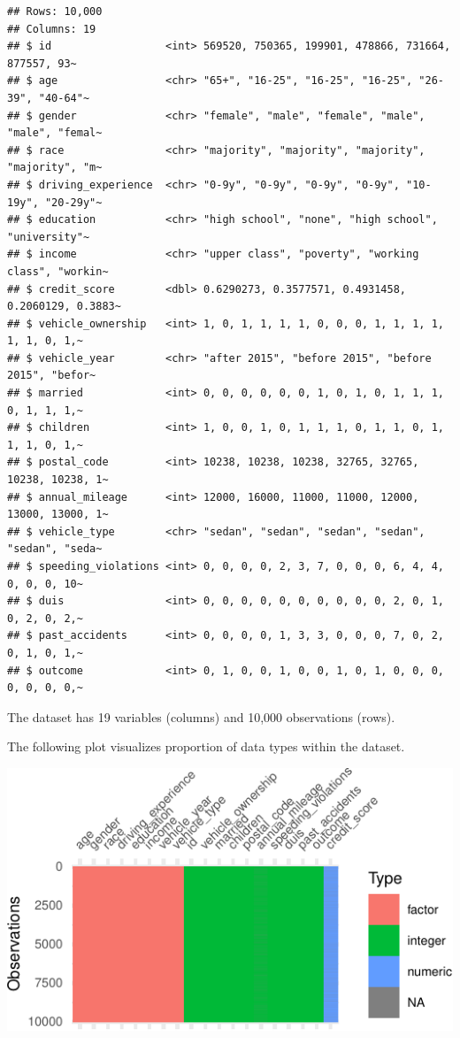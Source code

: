 \documentclass{article}
\begin{document}
\begin{verbatim}
## Rows: 10,000
## Columns: 19
## $ id                  <int> 569520, 750365, 199901, 478866, 731664, 877557, 93~
## $ age                 <chr> "65+", "16-25", "16-25", "16-25", "26-39", "40-64"~
## $ gender              <chr> "female", "male", "female", "male", "male", "femal~
## $ race                <chr> "majority", "majority", "majority", "majority", "m~
## $ driving_experience  <chr> "0-9y", "0-9y", "0-9y", "0-9y", "10-19y", "20-29y"~
## $ education           <chr> "high school", "none", "high school", "university"~
## $ income              <chr> "upper class", "poverty", "working class", "workin~
## $ credit_score        <dbl> 0.6290273, 0.3577571, 0.4931458, 0.2060129, 0.3883~
## $ vehicle_ownership   <int> 1, 0, 1, 1, 1, 1, 0, 0, 0, 1, 1, 1, 1, 1, 1, 0, 1,~
## $ vehicle_year        <chr> "after 2015", "before 2015", "before 2015", "befor~
## $ married             <int> 0, 0, 0, 0, 0, 0, 1, 0, 1, 0, 1, 1, 1, 0, 1, 1, 1,~
## $ children            <int> 1, 0, 0, 1, 0, 1, 1, 1, 0, 1, 1, 0, 1, 1, 1, 0, 1,~
## $ postal_code         <int> 10238, 10238, 10238, 32765, 32765, 10238, 10238, 1~
## $ annual_mileage      <int> 12000, 16000, 11000, 11000, 12000, 13000, 13000, 1~
## $ vehicle_type        <chr> "sedan", "sedan", "sedan", "sedan", "sedan", "seda~
## $ speeding_violations <int> 0, 0, 0, 0, 2, 3, 7, 0, 0, 0, 6, 4, 4, 0, 0, 0, 10~
## $ duis                <int> 0, 0, 0, 0, 0, 0, 0, 0, 0, 0, 2, 0, 1, 0, 2, 0, 2,~
## $ past_accidents      <int> 0, 0, 0, 0, 1, 3, 3, 0, 0, 0, 7, 0, 2, 0, 1, 0, 1,~
## $ outcome             <int> 0, 1, 0, 0, 1, 0, 0, 1, 0, 1, 0, 0, 0, 0, 0, 0, 0,~
\end{verbatim}

\normalsize

The dataset has 19 variables (columns) and 10,000 observations (rows).

The following plot visualizes proportion of data types within the
dataset.

\begin{center}\includegraphics{report_files/figure-latex/unnamed-chunk-3-1} \end{center}
\end{document}
